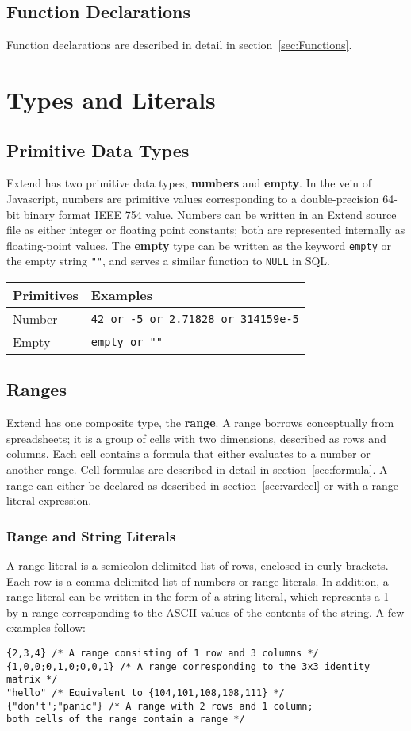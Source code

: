 	\subsection{Function Declarations}
		Function declarations are described in detail in section~\ref{sec:Functions}.
\section{Types and Literals}
	\subsection{Primitive Data Types}
		Extend has two primitive data types, \textbf{numbers} and \textbf{empty}. In the vein of Javascript, numbers are primitive values corresponding to a double-precision 64-bit binary format IEEE 754 value. Numbers can be written in an Extend source file as either integer or floating point constants; both are represented internally as floating-point values. The \textbf{empty} type can be written as the keyword \texttt{empty} or the empty string \texttt{""}, and serves a similar function to \texttt{NULL} in SQL.
		\newline
		\begin{table}[H]
		\centering
		\begin{tabular} {| l | l |}
			\hline
			\textbf{Primitives} & \textbf{Examples} \\ \hline
			Number & \texttt{42 or -5 or 2.71828 or 314159e-5} \\ \hline
			Empty & \texttt{empty or ""} \\ \hline
		\end{tabular}
		\end{table}
	\subsection{Ranges}
		Extend has one composite type, the \textbf{range}. A range borrows conceptually from spreadsheets; it is a group of cells with two dimensions, described as rows and columns. Each cell contains a formula that either evaluates to a number or another range. Cell formulas are described in detail in section~\ref{sec:formula}. A range can either be declared as described in section~\ref{sec:vardecl} or with a range literal expression.
\subsubsection{Range and String Literals}
		A range literal is a semicolon-delimited list of rows, enclosed in curly brackets. Each row is a comma-delimited list of numbers or range literals. In addition, a range literal can be written in the form of a string literal, which represents a 1-by-n range corresponding to the ASCII values of the contents of the string. A few examples follow: 
		
\begin{lstlisting}
{2,3,4} /* A range consisting of 1 row and 3 columns */
{1,0,0;0,1,0;0,0,1} /* A range corresponding to the 3x3 identity matrix */
"hello" /* Equivalent to {104,101,108,108,111} */
{"don't";"panic"} /* A range with 2 rows and 1 column; 
both cells of the range contain a range */
\end{lstlisting}
